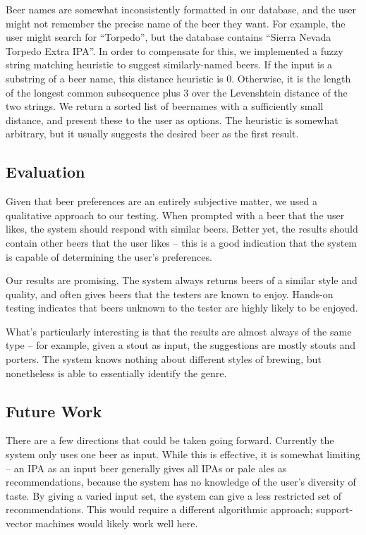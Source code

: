 \documentclass[11pt]{article}
\begin{document}
\begin{itemize}
  Beer names are somewhat inconsistently formatted in our database, and the user might not remember the precise name of the beer they want. For example, the user might search for ``Torpedo'', but the database contains ``Sierra Nevada Torpedo Extra IPA''. In order to compensate for this, we implemented a fuzzy string matching heuristic to suggest similarly-named beers. If the input is a substring of a beer name, this distance heuristic is 0. Otherwise, it is the length of the longest common subsequence plus 3 over the Levenshtein distance of the two strings. We return a sorted list of beernames with a sufficiently small distance, and present these to the user as options. The heuristic is somewhat arbitrary, but it usually suggests the desired beer as the first result.
\end{itemize}
\subsection*{Evaluation}
Given that beer preferences are an entirely subjective matter, we used a qualitative approach to our testing. When prompted with a beer that the user likes, the system should respond with similar beers. Better yet, the results should contain other beers that the user likes -- this is a good indication that the system is capable of determining the user's preferences.

Our results are promising. The system always returns beers of a similar style and quality, and often gives beers that the testers are known to enjoy. Hands-on testing indicates that beers unknown to the tester are highly likely to be enjoyed.

What's particularly interesting is that the results are almost always of the same type -- for example, given a stout as input, the suggestions are mostly stouts and porters. The system knows nothing about different styles of brewing, but nonetheless is able to essentially identify the genre.
\subsection*{Future Work}
There are a few directions that could be taken going forward. Currently the system only uses one beer as input. While this is effective, it is somewhat limiting -- an IPA as an input beer generally gives all IPAs or pale ales as recommendations, because the system has no knowledge of the user's diversity of taste. By giving a varied input set, the system can give a less restricted set of recommendations. This would require a different algorithmic approach; support-vector machines would likely work well here.
\end{document}
